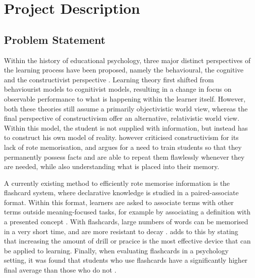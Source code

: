 \chapter{Project Description}

\section{Problem Statement}



Within the history of educational psychology, three major distinct perspectives of the learning process have been proposed, namely the behavioural, the cognitive and the constructivist perspective \cite{ertmer}. Learning theory first shifted from behaviourist models to cognitivist models, resulting in a change in focus on observable performance to what is happening within the learner itself. However, both these theories still assume a primarily objectivistic world view, whereas the final perspective of constructivism offer an alternative, relativistic world view. Within this model, the student is not supplied with information, but instead has to construct his own model of reality.  however criticised constructivism for its lack of rote memorisation, and argues for a need to train students so that they permanently possess facts and are able to repeat them flawlessly whenever they are needed, while also understanding what is placed into their memory.


A currently existing method to efficiently rote memorise information is the flashcard system, where declarative knowledge is studied in a paired-associate format. Within this format, learners are asked to associate terms with other terms outside meaning-focused tasks, for example by associating a definition with a presented concept \cite{nakata}. With flashcards, large numbers of words can be memorised in a very short time, and are more resistant to decay \cite{nakata, joseph}.  adds to this by stating that increasing the amount of drill or pracice is the most effective device that can be applied to learning. Finally, when evaluating flashcards in a psychology setting, it was found that students who use flashcards have a significantly higher final average than those who do not \cite{burgess, golding}.

